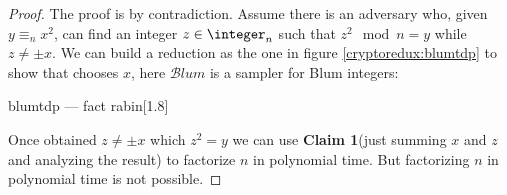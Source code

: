 \begin{proof}
    The proof is by contradiction. Assume there is an adversary \adversary{} who, given $y \equiv_n x^2$, can find an integer $z \in \integer_n$ such that $z^2 \mod n = y$ while $z \neq \pm x$. We can build a reduction as the one in figure \ref{cryptoredux:blumtdp} to show that \adversary{} chooses $x$, here $\mathcal{B}lum$ is a sampler for Blum integers:

    \begin{cryptoredux}
        {blumtdp}
        {---}
        {fact}
        {rabin}[1.8]


        \cseqdelay


        \cseqdelay

        
    \end{cryptoredux}

    
    Once obtained $z\neq \pm x$ which $z^{2}=y$ we can use \textbf{Claim 1}(just summing $x$ and $z$ and analyzing the result) to factorize $n$ in polynomial time. But factorizing $n$ in polynomial time is not possible.
\end{proof}
